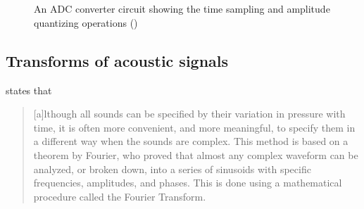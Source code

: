 \documentclass[report.tex]{subfiles}
\begin{document}
\begin{figure}[ht]
	\centering
	\hspace{0.1em}
	\\
	\vspace{0.1em}
	\\
	\caption{An ADC converter circuit showing the time sampling and amplitude quantizing operations (\cite[Chapter~4]{discretebook})}
	\label{fig:adccircuit}
\end{figure}

\newpagefill

\subsection{Transforms of acoustic signals}
\label{sec:freqdomain}

\textcite[Chapter~2B]{moore} states that

\begin{quote}
	[a]lthough all sounds can be specified by their variation in pressure with time, it is often more convenient, and more meaningful, to specify them in a different way when the sounds are complex. This method is based on a theorem by Fourier, who proved that almost any complex waveform can be analyzed, or broken down, into a series of sinusoids with specific frequencies, amplitudes, and phases. This is done using a mathematical procedure called the Fourier Transform.
\end{quote}
\end{document}
